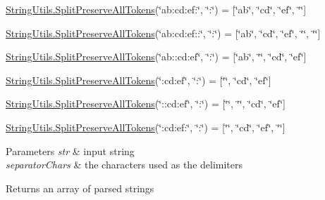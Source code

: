 \hyperlink{class_ultimate_1_1_utilities_1_1_string_utils_a64a975f2729d81bf8a31b1138db0443e}{String\+Utils.\+Split\+Preserve\+All\+Tokens}(\char`\"{}ab\+:cd\+:ef\+:\char`\"{}, \char`\"{}\+:\char`\"{}) = \mbox{[}\char`\"{}ab\char`\"{}, \char`\"{}cd\char`\"{}, \char`\"{}ef\char`\"{}, \char`\"{}\char`\"{}\mbox{]} 

\hyperlink{class_ultimate_1_1_utilities_1_1_string_utils_a64a975f2729d81bf8a31b1138db0443e}{String\+Utils.\+Split\+Preserve\+All\+Tokens}(\char`\"{}ab\+:cd\+:ef\+::\char`\"{}, \char`\"{}\+:\char`\"{}) = \mbox{[}\char`\"{}ab\char`\"{}, \char`\"{}cd\char`\"{}, \char`\"{}ef\char`\"{}, \char`\"{}\char`\"{}, \char`\"{}\char`\"{}\mbox{]} 

\hyperlink{class_ultimate_1_1_utilities_1_1_string_utils_a64a975f2729d81bf8a31b1138db0443e}{String\+Utils.\+Split\+Preserve\+All\+Tokens}(\char`\"{}ab\+::cd\+:ef\char`\"{}, \char`\"{}\+:\char`\"{}) = \mbox{[}\char`\"{}ab\char`\"{}, \char`\"{}\char`\"{}, \char`\"{}cd\char`\"{}, \char`\"{}ef\char`\"{}\mbox{]} 

\hyperlink{class_ultimate_1_1_utilities_1_1_string_utils_a64a975f2729d81bf8a31b1138db0443e}{String\+Utils.\+Split\+Preserve\+All\+Tokens}(\char`\"{}\+:cd\+:ef\char`\"{}, \char`\"{}\+:\char`\"{}) = \mbox{[}\char`\"{}\char`\"{}, \char`\"{}cd\char`\"{}, \char`\"{}ef\char`\"{}\mbox{]} 

\hyperlink{class_ultimate_1_1_utilities_1_1_string_utils_a64a975f2729d81bf8a31b1138db0443e}{String\+Utils.\+Split\+Preserve\+All\+Tokens}(\char`\"{}\+::cd\+:ef\char`\"{}, \char`\"{}\+:\char`\"{}) = \mbox{[}\char`\"{}\char`\"{}, \char`\"{}\char`\"{}, \char`\"{}cd\char`\"{}, \char`\"{}ef\char`\"{}\mbox{]} 

\hyperlink{class_ultimate_1_1_utilities_1_1_string_utils_a64a975f2729d81bf8a31b1138db0443e}{String\+Utils.\+Split\+Preserve\+All\+Tokens}(\char`\"{}\+:cd\+:ef\+:\char`\"{}, \char`\"{}\+:\char`\"{}) = \mbox{[}\char`\"{}\char`\"{}, \char`\"{}cd\char`\"{}, \char`\"{}ef\char`\"{}, \char`\"{}\char`\"{}\mbox{]} 


\begin{DoxyParams}{Parameters}
{\em str} & input string\\
\hline
{\em separator\+Chars} & the characters used as the delimiters\\
\hline
\end{DoxyParams}
\begin{DoxyReturn}{Returns}
an array of parsed strings
\end{DoxyReturn}
